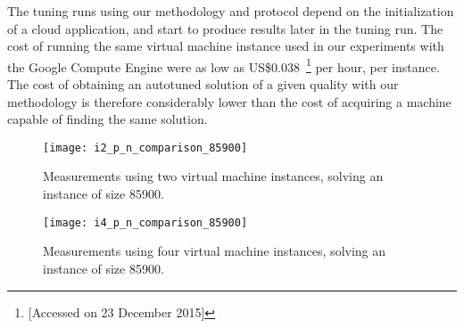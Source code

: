 The tuning runs using our methodology and protocol depend on the initialization
of a cloud application, and start to produce results later in the tuning run.
The cost of running the same virtual machine instance used in our experiments
with the Google Compute Engine were as low as
US\$0.038~\footnote{
[Accessed on 23 December 2015]} per hour, per instance. The cost of obtaining
an autotuned solution of a given quality with our methodology is therefore
considerably lower than the cost of acquiring a machine capable of finding
the same solution.

\begin{figure}[htpb]
    \centering
    \begin{minipage}{.48\textwidth}
        \centering
        \texttt{[image: i2\_p\_n\_comparison\_85900]}
        \caption{Measurements using two virtual machine instances,
                 solving an instance of size 85900.}
        \label{fig:85900tspi2}
    \end{minipage}%
    \hfill
    \begin{minipage}{.48\textwidth}
        \centering
        \texttt{[image: i4\_p\_n\_comparison\_85900]}
        \caption{Measurements using four virtual machine instances,
                 solving an instance of size 85900.}
        \label{fig:85900tspi4}
    \end{minipage}%
    \label{fig:85900tsp}
\end{figure}
